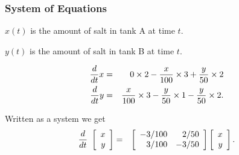\begin{frame}
  \frametitle{System of Equations}

  $x(t)$ is the amount of salt in tank A at time $t$.

  $y(t)$ is the amount of salt in tank B at time $t$.

  \begin{eqnarray*}
    \deriv{x}{t} & = & 0\times 2 - 
    \frac{x}{100}\times 3 + \frac{y}{50}\times 2 \\
    \deriv{y}{t} & = & \frac{x}{100} \times 3 -
    \frac{y}{50} \times 1 - \frac{y}{50}\times 2.
  \end{eqnarray*}

  Written as a system we get
  \begin{eqnarray*}
    \deriv{~}{t} \vecTwo{x}{y} & = & 
    \arrayTwo{-3/100}{2/50}{3/100}{-3/50} \vecTwo{x}{y}.
  \end{eqnarray*}
  
\end{frame}


